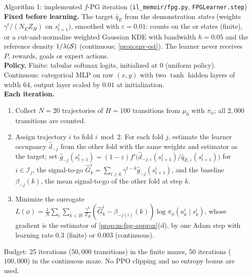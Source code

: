 \begin{algobox}{Algorithm 1: implemented $f$-PG iteration (\texttt{il\_memoir/fpg.py}, \texttt{FPGLearner.step})}
\small
\textbf{Fixed before learning.} The target $\hat q_E$ from the demonstration \emph{states} (weights $\gamma^t/(N_EZ_H)$ on $s^i_{t+1}$), smoothed with $\varepsilon=0.01$: counts on the  or  states (finite), or a cut-and-normalize weighted Gaussian KDE with bandwidth $h=0.05$ and the reference density $1/\lambda(\mathcal{S})$ (continuous; \cref{prop:env-est}). The learner never receives $P$, rewards, goals or expert actions.\\[2pt]
\textbf{Policy.} Finite: tabular softmax logits, initialized at $0$ (uniform policy). Continuous: categorical MLP on raw $(x,y)$ with two $\tanh$ hidden layers of width $64$, output layer scaled by $0.01$ at initialization.\\[2pt]
\textbf{Each iteration.}
\begin{enumerate}[nosep,leftmargin=1.3em]
\item Collect $N=20$ trajectories of $H=100$ transitions from $\mu_0$ with $\pi_\phi$; all $2{,}000$ transitions are counted.
\item Assign trajectory $i$ to fold $i\bmod 2$. For each fold $j$, estimate the learner occupancy $\hat d_{-j}$ from the other fold with the same weights and estimator as the target; set $\hat g_{-j}(s^i_{t+1})=(1-\varepsilon)f'\big(\hat d_{-j,\varepsilon}(s^i_{t+1})/\hat q_{E,\varepsilon}(s^i_{t+1})\big)$ for $i\in\mathcal I_j$, the signal-to-go $\hat G^i_k=\sum_{t\ge k}\gamma^{t-k}\hat g_{-j}(s^i_{t+1})$, and the baseline $\beta_{-j}(k)$, the mean signal-to-go of the other fold at step $k$.
\item Minimize the surrogate $L(\phi)=\frac1N\sum_i\sum_{k<H}\frac{\gamma^k}{Z_H}(\hat G^i_k-\beta_{-j(i)}(k))\log\pi_\phi(a^i_k\mid s^i_k)$, whose gradient is the estimator of \cref{prop:m-fpg-approx}(d), by one Adam step \citep{kingma2015adam} with learning rate $0.3$ (finite) or $0.003$ (continuous).
\end{enumerate}
Budget: 25 iterations ($50{,}000$ transitions) in the finite mazes, 50 iterations ($100{,}000$) in the continuous maze. No PPO clipping and no entropy bonus are used.
\end{algobox}

